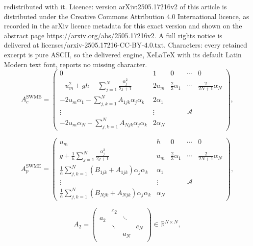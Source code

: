 \documentclass[10pt,a4paper]{amsart}
\begin{document}
redistributed with it. Licence: version arXiv:2505.17216v2 of this article is distributed under the Creative Commons Attribution 4.0 International licence, as recorded in the arXiv licence metadata for this exact version and shown on the abstract page https://arxiv.org/abs/2505.17216v2. A full rights notice is delivered at licenses/arxiv-2505.17216-CC-BY-4.0.txt. Characters: every retained excerpt is pure ASCII, so the delivered engine, XeLaTeX with its default Latin Modern text font, reports no missing character.
    \begin{equation}\label{eq:A_SWME_c}
        A^{\textrm{SWME}}_{c} =
        \left(\begin{array}{ccccc}
        0 & 1 & 0 & \cdots & 0 \\
        - u_m^2 + gh - \sum\limits_{j=1}^{N} \frac{\alpha_j^2}{2j+1} & 2 u_m & \frac{2}{3} \alpha_1 & \cdots & \frac{2}{2 N+1} \alpha_N \\
        -2 u_m \alpha_1 - \sum\limits_{j,k=1}^{N} A_{1jk} \alpha_j \alpha_k & 2 \alpha_1 &  & & \\
        \vdots & \vdots & & \mathcal{A} &  \\
        -2 u_m \alpha_N - \sum\limits_{j,k=1}^{N} A_{Njk} \alpha_j \alpha_k & 2 \alpha_N &  & &
        \end{array}\right),
    \end{equation}

    \begin{equation}\label{eq:A_SWME_p}
        A^{\textrm{SWME}}_{p} =
        \left(\begin{array}{ccccc}
        u_m & h & 0 & \cdots & 0 \\
        g + \frac{1}{h}\sum\limits_{j=1}^{N} \frac{\alpha_j^2}{2j+1} & u_m & \frac{2}{3} \alpha_1 & \cdots & \frac{2}{2 N+1} \alpha_N \\
        \frac{1}{h}\sum\limits_{j,k=1}^{N} \left(B_{1jk} + A_{1jk} \right) \alpha_j \alpha_k & \alpha_1 &  & & \\
        \vdots & \vdots & & \mathcal{A} &  \\
        \frac{1}{h}\sum\limits_{j,k=1}^{N} \left(B_{Njk} + A_{Njk} \right) \alpha_j \alpha_k & \alpha_N &  & &
        \end{array}\right),
    \end{equation}

\begin{equation}\label{eq:A_2}
        A_2 =
        \left(\begin{array}{cccc}
         & c_2 & &  \\
        a_2 & & \ddots &  \\
         & \ddots & & c_N \\
         &  & a_N &  \\
         \end{array}\right) \in \mathbb{R}^{N \times N},
\end{equation}
\end{document}
